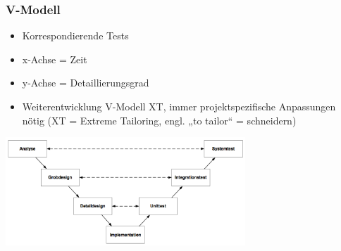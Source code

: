 \subsubsection{V-Modell}
\begin{minipage}{8cm}
	\begin{itemize}
		\item Korrespondierende Tests
		\item x-Achse = Zeit
		\item y-Achse = Detaillierungsgrad
		\item Weiterentwicklung V-Modell XT,\newline
        immer projektspezifische Anpassungen nötig\newline
        (XT = Extreme Tailoring, engl. „to tailor“ = schneidern)
	\end{itemize}
\end{minipage}
\begin{minipage}{9cm}
	\includegraphics[width=9cm]{images/v_modell.png}	
\end{minipage}


